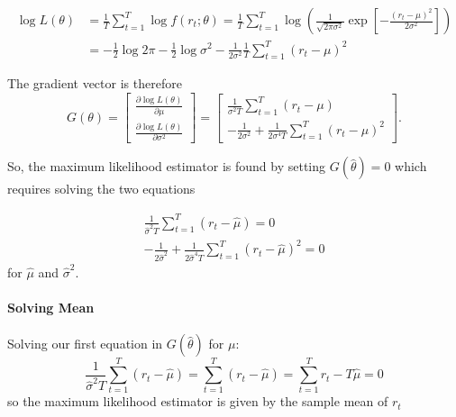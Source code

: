 \documentclass[11pt]{article}
\begin{document}
\begin{equation}
\begin{aligned}
\log L(\theta) & =\frac{1}{T} \sum_{t=1}^T \log f\left(r_t ; \theta\right)=\frac{1}{T} \sum_{t=1}^T \log \left(\frac{1}{\sqrt{2 \pi \sigma^2}} \exp \left[-\frac{\left(r_t-\mu\right)^2}{2 \sigma^2}\right]\right) \\
& =-\frac{1}{2} \log 2 \pi-\frac{1}{2} \log \sigma^2-\frac{1}{2 \sigma^2} \frac{1}{T} \sum_{t=1}^T\left(r_t-\mu\right)^2
\end{aligned}
\end{equation}

The gradient vector is therefore
\begin{equation}
G(\theta)=\left[\begin{array}{c}
\frac{\partial \log L(\theta)}{\partial \mu} \\
\frac{\partial \log L(\theta)}{\partial \sigma^2}
\end{array}\right]=\left[\begin{array}{c}
\frac{1}{\sigma^2 T} \sum_{t=1}^T\left(r_t-\mu\right) \\
-\frac{1}{2 \sigma^2}+\frac{1}{2 \sigma^4 T} \sum_{t=1}^T\left(r_t-\mu\right)^2
\end{array}\right] .
\end{equation}

So, the maximum likelihood estimator is found by setting $G(\hat{\theta}) = 0$ which requires solving the two equations

\begin{equation}
\begin{array}{r}
\frac{1}{\widehat{\sigma}^2 T} \sum_{t=1}^T\left(r_t-\widehat{\mu}\right)=0 \\
-\frac{1}{2 \widehat{\sigma}^2}+\frac{1}{2 \widehat{\sigma}^4 T} \sum_{t=1}^T\left(r_t-\widehat{\mu}\right)^2=0
\end{array}
\end{equation}
for $\hat{\mu}$ and $\hat{\sigma}^2$.

\paragraph{Solving Mean} \mbox{}

Solving our first equation in $G(\hat{\theta})$ for $\mu$:
\begin{equation}
\frac{1}{\widehat{\sigma}^2 T} \sum_{t=1}^T\left(r_t-\widehat{\mu}\right)=\sum_{t=1}^T\left(r_t-\widehat{\mu}\right)=\sum_{t=1}^T r_t-T \widehat{\mu}=0
\end{equation}
so the maximum likelihood estimator is given by the sample mean of $r_t$
\end{document}
